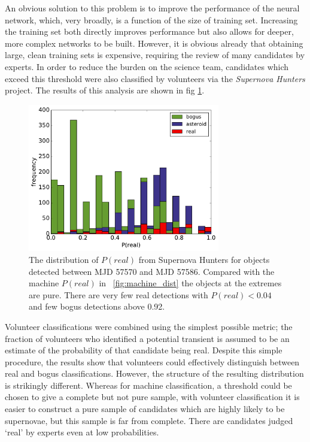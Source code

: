 \documentclass[a4paper,fleqn,usenatbib]{mnras}
\begin{document}
An obvious solution to this problem is to improve the performance of the neural network, which, very broadly, is a function of the size of training set. Increasing the training set both directly improves performance but also allows for deeper, more complex networks to be built. However, it is obvious already that obtaining large, clean training sets is expensive, requiring the review of many candidates by experts. In order to reduce the burden on the science team, candidates which exceed this threshold were also classified by volunteers via the \emph{Supernova Hunters} project. The results of this analysis are shown in fig \ref{fig:human_dist}. 

\begin{figure}
   \includegraphics[width=84mm]{figs/human_hist.pdf}
   \caption{The distribution of $P(real)$ from Supernova Hunters for objects detected between 
            MJD 57570 and MJD 57586.  Compared with the machine $P(real)$ in ~\ref{fig:machine_dist}
            the objects at the extremes are pure.  There are very few real detections with 
            $P(real) < 0.04$ and few bogus detections above 0.92.} 
   \label{fig:human_dist} 
\end{figure}

Volunteer classifications were combined using the simplest possible metric; the fraction of volunteers who identified a potential transient is assumed to be an estimate of the probability of that candidate being real. Despite this simple procedure, the results show that volunteers could effectively distinguish between real and bogus classifications. However, the structure of the resulting distribution is strikingly different. Whereas for machine classification, a threshold could be chosen to give a complete but not pure sample, with volunteer classification it is easier to construct a pure sample of candidates which are highly likely to be supernovae, but this sample is far from complete. There are candidates judged `real' by experts even at low probabilities. 
\end{document}
